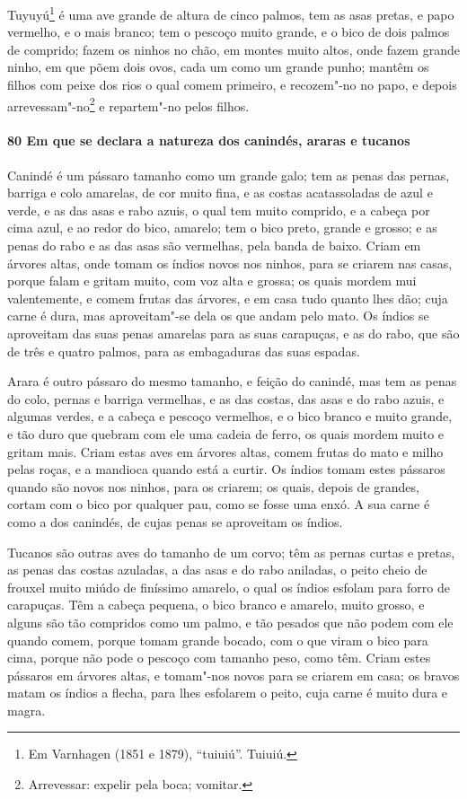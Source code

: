 Tuyuyú\footnote{ Em Varnhagen (1851 e 1879), ``tuiuiú''. Tuiuiú.} é uma ave grande de
altura de cinco palmos, tem as asas pretas, e papo vermelho, e o mais branco; tem o
pescoço muito grande, e o bico de dois palmos de comprido; fazem os ninhos no chão, em
montes muito altos, onde fazem grande ninho, em que põem dois ovos, cada um como um grande
punho; mantêm os filhos com peixe dos rios o qual comem primeiro, e recozem"-no no papo, e
depois arrevessam"-no\footnote{ Arrevessar: expelir pela boca; vomitar.} e repartem"-no
pelos filhos.

\paragraph{80 Em que se declara a natureza dos canindés, araras e tucanos}

Canindé é um pássaro tamanho como um grande galo; tem as penas das pernas, barriga e colo
amarelas, de cor muito fina, e as costas acatassoladas de azul e verde, e as das asas e
rabo azuis, o qual tem muito comprido, e a cabeça por cima azul, e ao redor do bico,
amarelo; tem o bico preto, grande e grosso; e as penas do rabo e as das asas são
vermelhas, pela banda de baixo. Criam em árvores altas, onde tomam os índios novos nos
ninhos, para se criarem nas casas, porque falam e gritam muito, com voz alta e grossa; os
quais mordem mui valentemente, e comem frutas das árvores, e em casa tudo quanto lhes dão;
cuja carne é dura, mas aproveitam"-se dela os que andam pelo mato. Os índios se aproveitam
das suas penas amarelas para as suas carapuças, e as do rabo, que são de três e quatro
palmos, para as embagaduras das suas espadas.

Arara é outro pássaro do mesmo tamanho, e feição do canindé, mas tem as penas do colo,
pernas e barriga vermelhas, e as das costas, das asas e do rabo azuis, e algumas verdes, e
a cabeça e pescoço vermelhos, e o bico branco e muito grande, e tão duro que quebram com
ele uma cadeia de ferro, os quais mordem muito e gritam mais. Criam estas aves em árvores
altas, comem frutas do mato e milho pelas roças, e a mandioca quando está a curtir. Os
índios tomam estes pássaros quando são novos nos ninhos, para os criarem; os quais, depois
de grandes, cortam com o bico por qualquer pau, como se fosse uma enxó. A sua carne é como
a dos canindés, de cujas penas se aproveitam os índios.

Tucanos são outras aves do tamanho de um corvo; têm as pernas curtas e pretas, as penas
das costas azuladas, a das asas e do rabo aniladas, o peito cheio de frouxel muito miúdo
de finíssimo amarelo, o qual os índios esfolam para forro de carapuças. Têm a cabeça
pequena, o bico branco e amarelo, muito grosso, e alguns são tão compridos como um palmo,
e tão pesados que não podem com ele quando comem, porque tomam grande bocado, com o que
viram o bico para cima, porque não pode o pescoço com tamanho peso, como têm. Criam estes
pássaros em árvores altas, e tomam"-nos novos para se criarem em casa; os bravos matam os
índios a flecha, para lhes esfolarem o peito, cuja carne é muito dura e magra.

